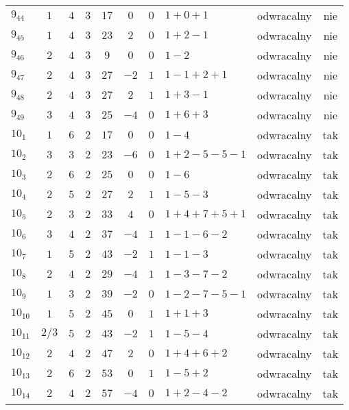 \begin{longtable}{lccccccllc}
$9_{44}$   & $1$   & $4$ & $3$ & $17$  & $0$  & $0$ & $1+0+1$       & odwracalny & nie \\
$9_{45}$   & $1$   & $4$ & $3$ & $23$  & $2$  & $0$ & $1+2-1$       & odwracalny & nie \\
$9_{46}$   & $2$   & $4$ & $3$ & $9$   & $0$  & $0$ & $1-2$         & odwracalny & nie \\
$9_{47}$   & $2$   & $4$ & $3$ & $27$  & $-2$ & $1$ & $1-1+2+1$     & odwracalny & nie \\
$9_{48}$   & $2$   & $4$ & $3$ & $27$  & $2$  & $1$ & $1+3-1$       & odwracalny & nie \\
$9_{49}$   & $3$   & $4$ & $3$ & $25$  & $-4$ & $0$ & $1+6+3$       & odwracalny & nie \\
$10_{1}$   & $1$   & $6$ & $2$ & $17$  & $0$  & $0$ & $1-4$         & odwracalny & tak \\
$10_{2}$   & $3$   & $3$ & $2$ & $23$  & $-6$ & $0$ & $1+2-5-5-1$   & odwracalny & tak \\
$10_{3}$   & $2$   & $6$ & $2$ & $25$  & $0$  & $0$ & $1-6$         & odwracalny & tak \\
$10_{4}$   & $2$   & $5$ & $2$ & $27$  & $2$  & $1$ & $1-5-3$       & odwracalny & tak \\
$10_{5}$   & $2$   & $3$ & $2$ & $33$  & $4$  & $0$ & $1+4+7+5+1$   & odwracalny & tak \\
$10_{6}$   & $3$   & $4$ & $2$ & $37$  & $-4$ & $1$ & $1-1-6-2$     & odwracalny & tak \\
$10_{7}$   & $1$   & $5$ & $2$ & $43$  & $-2$ & $1$ & $1-1-3$       & odwracalny & tak \\
$10_{8}$   & $2$   & $4$ & $2$ & $29$  & $-4$ & $1$ & $1-3-7-2$     & odwracalny & tak \\
$10_{9}$   & $1$   & $3$ & $2$ & $39$  & $-2$ & $0$ & $1-2-7-5-1$   & odwracalny & tak \\
$10_{10}$  & $1$   & $5$ & $2$ & $45$  & $0$  & $1$ & $1+1+3$       & odwracalny & tak \\
$10_{11}$  & $2/3$ & $5$ & $2$ & $43$  & $-2$ & $1$ & $1-5-4$       & odwracalny & tak \\
$10_{12}$  & $2$   & $4$ & $2$ & $47$  & $2$  & $0$ & $1+4+6+2$     & odwracalny & tak \\
$10_{13}$  & $2$   & $6$ & $2$ & $53$  & $0$  & $1$ & $1-5+2$       & odwracalny & tak \\
$10_{14}$  & $2$   & $4$ & $2$ & $57$  & $-4$ & $0$ & $1+2-4-2$     & odwracalny & tak \\

\end{longtable}
